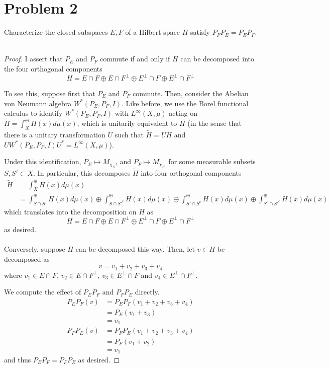 \documentclass[fontsize=11pt]{scrartcl} %
\numberwithin{equation}{section} %
\numberwithin{figure}{section} %
\numberwithin{table}{section} %
\begin{document}
\section*{Problem 2}
Characterize the closed subspaces $E,F$ of a Hilbert space $H$ satisfy
$P_FP_E=P_EP_F$.
\\
\\
\begin{proof}
    I assert that $P_E$ and $P_F$ commute if and only if $H$ can be decomposed
    into the four orthogonal components
    \[
        H = E\cap F\oplus E\cap F^{\perp}\oplus E^{\perp}\cap F\oplus
        E^{\perp}\cap F^{\perp}
    \]

    To see this, suppose first that $P_E$ and $P_F$ commute. Then, consider the
    Abelian von Neumann algebra $W^*(P_E,P_F,I)$. Like before, we use the Borel
    functional calculus to identify $W^*(P_E,P_F,I)$ with $L^{\infty}(X,\mu)$
    acting on $\tilde{H} = \int_X^{\oplus}H(x)d\mu(x)$, which is unitarily
    equivalent to $H$ (in the sense that there is a unitary transformation $U$
    such that $\tilde{H}=UH$ and $UW^*(P_E,P_F,I)U^*=L^{\infty}(X,\mu)$).

    Under this identification, $P_E\mapsto M_{\chi_S}$, and $P_F\mapsto
    M_{\chi_{S'}}$ for some measurable subsets $S,S'\subset X$. In particular,
    this decomposes $\tilde{H}$ into four orthogonal components
    \[
        \begin{aligned}
            \tilde{H} &= \int_X^{\oplus}H(x)d\mu(x)\\
            &= \int_{S\cap S'}^{\oplus}H(x)d\mu(x)\oplus 
            \int_{S\cap S'^c}^{\oplus}H(x)d\mu(x)\oplus
            \int_{S'\cap S^c}^{\oplus}H(x)d\mu(x)\oplus
            \int_{S^c\cap S'^c}^{\oplus}H(x)d\mu(x)
        \end{aligned}
    \]
    which translates into the decomposition on $H$ as
    \[
        H = E\cap F\oplus E\cap F^{\perp}\oplus E^{\perp}\cap F\oplus
        E^{\perp}\cap F^{\perp}
    \]
    as desired.
    \\
    \\
    Conversely, suppose $H$ can be decomposed this way. Then, let $v\in H$ be
    decomposed as 
    \[
        v= v_1 + v_2 + v_3 + v_4
    \]
    where $v_1\in E\cap F$, $v_2\in E\cap F^{\perp}$, $v_3\in E^{\perp}\cap F$
    and $v_4\in E^{\perp}\cap F^{\perp}$.

    We compute the effect of $P_EP_F$ and $P_FP_E$ directly.
    \[
\begin{aligned}
    P_EP_F(v) &= P_EP_F(v_1+v_2+v_3+v_4)\\
    &= P_E(v_1 + v_3)\\
    &= v_1\\
    P_FP_E(v) &= P_FP_E(v_1+v_2+v_3+v_4)\\
    &=P_F(v_1+v_2)\\
    &=v_1
\end{aligned}
    \]
    and thus $P_EP_F=P_FP_E$ as desired.
\end{proof}
\end{document}
